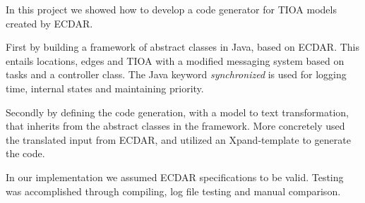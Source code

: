 In this project we showed how to develop a code generator for TIOA 
models created by ECDAR. 

First by building a framework of abstract classes in Java, based on 
ECDAR. This entails locations, edges and TIOA with a modified messaging 
system based on tasks and a controller class. The Java keyword 
\textit{synchronized} is used for logging time, internal states and 
maintaining priority. 

Secondly by defining the code generation, with a model to text 
transformation, that inherits from the abstract classes in the 
framework. More concretely used the translated input from ECDAR, and 
utilized an Xpand-template to generate the code. 

In our implementation we assumed ECDAR specifications to be valid. 
Testing was accomplished through compiling, log file testing and manual 
comparison. 
